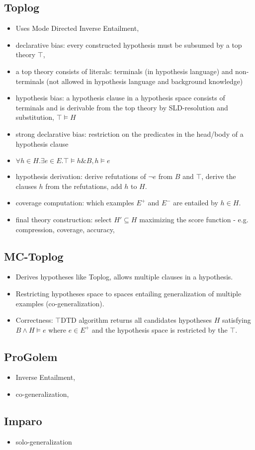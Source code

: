 \subsection{Toplog}
\begin{itemize}
\item Uses Mode Directed Inverse Entailment,
\item declarative bias: every constructed hypothesis must be subsumed by a top theory $\top$,
\item a top theory consists of literals: terminals (in hypothesis language) and non-terminals (not allowed in hypothesis language and background knowledge)
\item hypothesis bias: a hypothesis clause in a hypothesis space consists of terminals and is derivable from the top theory by SLD-resolution and substitution, $\top \models H$
\item strong declarative bias: restriction on the predicates in the head/body of a hypothesis clause
\item $\forall h \in H. \exists e \in E. \top \models h \& B, h \models e$
\item hypothesis derivation: derive refutations of $\neg e$ from $B$ and $\top$, derive the clauses $h$ from the refutations, add $h$ to $H$.
\item coverage computation: which examples $E^+$ and $E^-$ are entailed by $h \in H$.
\item final theory construction: select $H' \subseteq H$ maximizing the score function - e.g. compression, coverage, accuracy,
\end{itemize}

\subsection{MC-Toplog}
\begin{itemize}
\item Derives hypotheses like Toplog, allows multiple clauses in a hypothesis.
\item Restricting hypotheses space to spaces entailing generalization of multiple examples (co-generalization).
\item Correctness: $\top$DTD algorithm returns all candidates hypotheses $H$ satisfying $B \wedge H \models e$ where $e \in E^+$ and the hypothesis space is restricted by the $\top$.
\end{itemize}

\subsection{ProGolem}
\begin{itemize}
\item Inverse Entailment,
\item co-generalization, 
\end{itemize}

\subsection{Imparo}
\begin{itemize}
\item solo-generalization
\end{itemize}